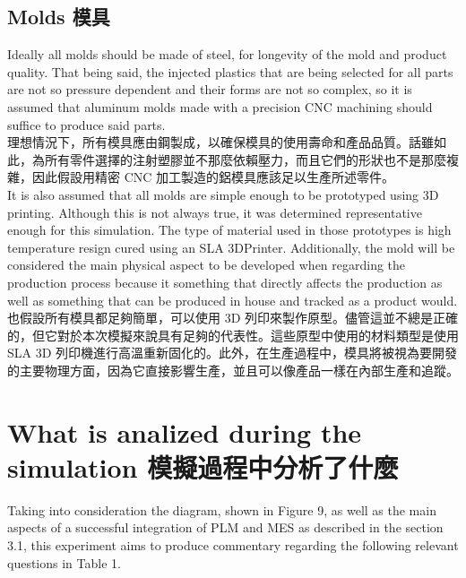 \subsection{Molds 模具}

\fontsize{14pt}{2.5pt}\sectionef 
{Ideally all molds should be made of steel, for longevity of the mold and product quality. That being said, the injected plastics that are being selected for all parts are not so pressure dependent and their forms are not so complex, so it is assumed that aluminum molds made with a precision CNC machining should suffice to produce said parts.}\\[10pt]

\fontsize{14pt}{5pt}\sectionef
 {理想情況下，所有模具應由鋼製成，以確保模具的使用壽命和產品品質。話雖如此，為所有零件選擇的注射塑膠並不那麼依賴壓力，而且它們的形狀也不是那麼複雜，因此假設用精密 CNC 加工製造的鋁模具應該足以生產所述零件。}\\[15pt]

\fontsize{14pt}{2.5pt}\sectionef 
{It is also assumed that all molds are simple enough to be prototyped using 3D printing. Although this is not always true, it was determined representative enough for this simulation. The type of material used in those prototypes is high temperature resign cured using an SLA 3DPrinter. Additionally, the mold will be considered the main physical aspect to be developed when regarding the production process because it something that directly affects the production as well as something that can be produced in house and tracked as a product would.}\\[10pt]

\fontsize{14pt}{5pt}\sectionef
 {也假設所有模具都足夠簡單，可以使用 3D 列印來製作原型。儘管這並不總是正確的，但它對於本次模擬來說具有足夠的代表性。這些原型中使用的材料類型是使用 SLA 3D 列印機進行高溫重新固化的。此外，在生產過程中，模具將被視為要開發的主要物理方面，因為它直接影響生產，並且可以像產品一樣在內部生產和追蹤。}\\[15pt]

\section{What is analized during the simulation 模擬過程中分析了什麼}

\fontsize{14pt}{2.5pt}\sectionef 
{Taking into consideration the diagram, shown in Figure 9, as well as the main aspects of a successful integration of PLM and MES as described in the section 3.1, this experiment aims to produce commentary regarding the following relevant questions in Table 1.}\\[10pt]

